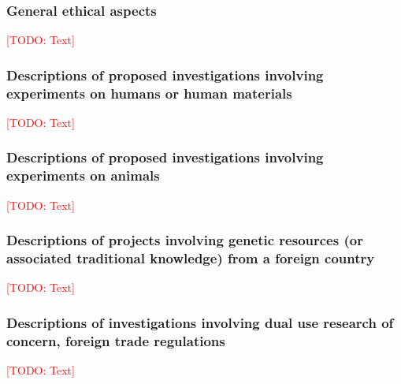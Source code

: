 \documentclass[american,firsttime]{dfgproposal}
\newcommand{\todo}[1]{\xspace{\textcolor{red}{[TODO: #1]}}\xspace}
\begin{document}
	\subsubsection{General ethical aspects}
	\todo{Text}
	
	\subsubsection{Descriptions of proposed investigations involving experiments on humans or human materials}
	\todo{Text}
	
	\subsubsection{Descriptions of proposed investigations involving experiments on animals}
	\todo{Text}
	
	\subsubsection{Descriptions of projects involving genetic resources (or associated traditional knowledge) from a foreign country}
	\todo{Text}
	
	\subsubsection{Descriptions of investigations involving dual use research of concern, foreign trade regulations}
	\todo{Text}
	
\end{document}
